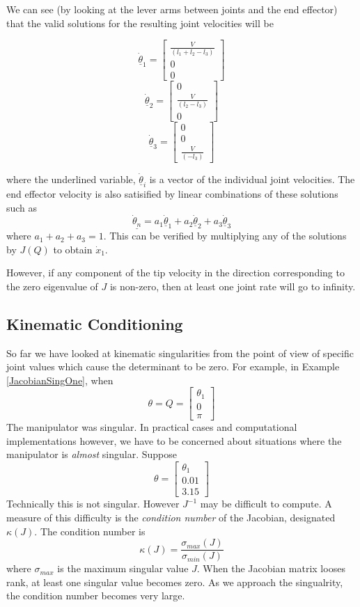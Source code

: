 We can see (by looking at the lever arms between joints and the end effector) that the valid solutions for the resulting joint velocities will be

\[
\dot{\underline{\theta}}_1 = \begin{bmatrix} \frac{V}{(l_1+l_2-l_3)} \\ 0 \\ 0   \end{bmatrix}
\]
\[
\dot{\underline{\theta}}_2 = \begin{bmatrix} 0 \\ \frac{V}{(l_2-l_3)}   \\ 0   \end{bmatrix}
\]
\[
\dot{\underline{\theta}}_3 = \begin{bmatrix} 0 \\ 0 \\ \frac{V}{(-l_3)}    \end{bmatrix}
\]

where the underlined variable, $\underline{\dot{\theta}}_i$ is a vector of the individual joint velocities.
The end effector velocity is also satisified by  linear combinations of these solutions such as
\[
\underline{\dot{\theta}_n} = a_1\underline{\dot{\theta}}_1 +  a_2\underline{\dot{\theta}}_2 +  a_3\underline{\dot{\theta}}_3
\]
where $a_1+a_2+a_3=1$.    This can be verified by multiplying any of the solutions by $J(Q)$ to obtain $\dot{x}_1$.

However, if any component of the tip velocity in the direction corresponding to the zero eigenvalue of $J$ is non-zero, then at least one joint rate will go to infinity.



\subsection{Kinematic Conditioning}

So far we have looked at kinematic singularities from the point of view of specific joint values which cause the determinant to be zero.  For example, in Example \ref{JacobianSingOne}, when
\[
\theta = Q = \begin{bmatrix} \theta_1 \\ 0 \\ \pi \end{bmatrix}
\]
The manipulator was singular.  In practical cases and computational implementations however, we have to be concerned about situations where the manipulator is {\it almost} singular.    Suppose
\[
\theta = \begin{bmatrix} \theta_1 \\ 0.01 \\ 3.15 \end{bmatrix}
\]
Technically this is not singular.  However $J^{-1}$ may be difficult to compute.   A measure of this difficulty is the {\it condition number} of the Jacobian, designated $\kappa(J)$.   The condition number is
\[
\kappa(J) = \frac {\sigma_{max}(J)}  {\sigma_{min}(J)}
\]
where $\sigma_{max}$ is the maximum singular value $J$.  When the Jacobian matrix looses rank, at least one singular value becomes zero. As we approach the singualrity,  the condition number becomes very large.

